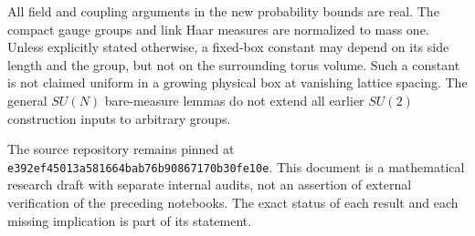 \documentclass[11pt]{article}
\theoremstyle{remark}
\begin{document}
All field and coupling arguments in the new probability bounds
are real. The compact gauge groups and link Haar measures are
normalized to mass one. Unless explicitly stated otherwise, a
fixed-box constant may depend on its side length and the group,
but not on the surrounding torus volume. Such a constant is not
claimed uniform in a growing physical box at vanishing lattice
spacing. The general \(SU(N)\) bare-measure lemmas do not extend
all earlier \(SU(2)\) construction inputs to arbitrary groups.

The source repository remains pinned at
\texttt{e392ef45013a581664bab76b90867170b30fe10e}. This document is
a mathematical research draft with separate internal audits, not
an assertion of external verification of the preceding notebooks.
The exact status of each result and each missing implication is
part of its statement.
\end{document}
